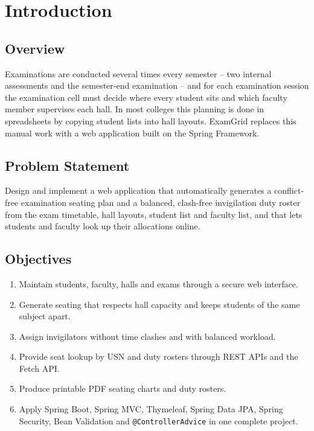 \documentclass[12pt,a4paper,oneside]{report}
\begin{document}
\tableofcontents
\listoffigures
\listoftables
\newpage
{}

\chapter{Introduction}
\section{Overview}
Examinations are conducted several times every semester -- two internal assessments and the semester-end examination -- and for each examination session the examination cell must decide where every student sits and which faculty member supervises each hall. In most colleges this planning is done in spreadsheets by copying student lists into hall layouts. ExamGrid replaces this manual work with a web application built on the Spring Framework.

\section{Problem Statement}
Design and implement a web application that automatically generates a conflict-free examination seating plan and a balanced, clash-free invigilation duty roster from the exam timetable, hall layouts, student list and faculty list, and that lets students and faculty look up their allocations online.

\section{Objectives}
\begin{enumerate}
  \item Maintain students, faculty, halls and exams through a secure web interface.
  \item Generate seating that respects hall capacity and keeps students of the same subject apart.
  \item Assign invigilators without time clashes and with balanced workload.
  \item Provide seat lookup by USN and duty rosters through REST APIs and the Fetch API.
  \item Produce printable PDF seating charts and duty rosters.
  \item Apply Spring Boot, Spring MVC, Thymeleaf, Spring Data JPA, Spring Security, Bean Validation and \texttt{@ControllerAdvice} in one complete project.
\end{enumerate}
\end{document}
